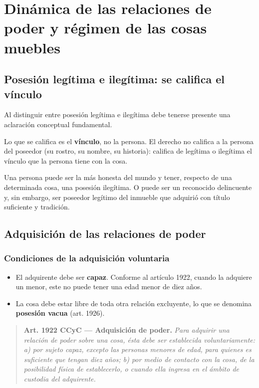 \documentclass[12pt,oneside]{book}
\begin{document}
\chapter[Dinámica de las relaciones de poder]{Dinámica de las relaciones de poder y régimen de las cosas muebles}

\section{Posesión legítima e ilegítima: se califica el vínculo}

Al distinguir entre posesión legítima e ilegítima debe tenerse presente una aclaración conceptual fundamental.

\begin{important}
Lo que se califica es el \textbf{vínculo}, no la persona. El derecho no califica a la persona del poseedor (su rostro, su nombre, su historia): califica de legítima o ilegítima el vínculo que la persona tiene con la cosa.
\end{important}

Una persona puede ser la más honesta del mundo y tener, respecto de una determinada cosa, una posesión ilegítima. O puede ser un reconocido delincuente y, sin embargo, ser poseedor legítimo del inmueble que adquirió con título suficiente y tradición.

\section{Adquisición de las relaciones de poder}

\subsection{Condiciones de la adquisición voluntaria}

\begin{itemize}
    \item El adquirente debe ser \textbf{capaz}. Conforme al artículo 1922, cuando la adquiere un menor, este no puede tener una edad menor de diez años.
    \item La cosa debe estar libre de toda otra relación excluyente, lo que se denomina \textbf{posesión vacua} (art. 1926).
\end{itemize}

\begin{quote}
\textbf{Art. 1922 CCyC --- Adquisición de poder.} \textit{Para adquirir una relación de poder sobre una cosa, ésta debe ser establecida voluntariamente: a) por sujeto capaz, excepto las personas menores de edad, para quienes es suficiente que tengan diez años; b) por medio de contacto con la cosa, de la posibilidad física de establecerlo, o cuando ella ingresa en el ámbito de custodia del adquirente.}
\end{quote}
\end{document}

